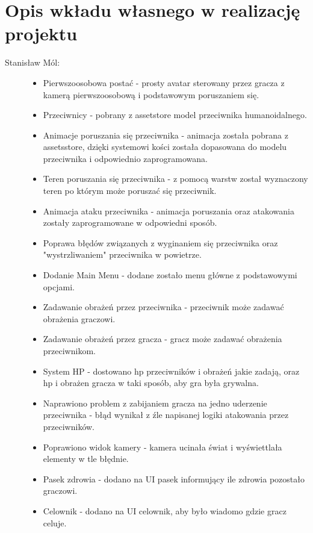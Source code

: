 \documentclass[10pt,a4paper]{article}
\begin{document}
\clearpage
\section{Opis wkładu własnego w realizację projektu}

\vspace{0.5cm}
\begin{description}
  \item[Stanisław Mól:] \hfill
  	\begin{itemize}
 	  \item Pierwszoosobowa postać - prosty avatar sterowany przez gracza z kamerą pierwszoosobową i podstawowym poruszaniem się.
	  \item Przeciwnicy - pobrany z assetstore model przeciwnika humanoidalnego.
	  \item Animacje poruszania się przeciwnika - animacja została pobrana z assetsstore, dzięki systemowi kości została dopasowana do modelu przeciwnika i 				  odpowiednio zaprogramowana.
	  \item Teren poruszania się przeciwnika - z pomocą warstw został wyznaczony teren po którym może poruszać się przeciwnik.
	  \item Animacja ataku przeciwnika - animacja poruszania oraz atakowania zostały zaprogramowane w odpowiedni sposób.
	  \item Poprawa błędów związanych z wyginaniem się przeciwnika oraz "wystrzliwaniem" przeciwnika w powietrze.
	  \item Dodanie Main Menu - dodane zostało menu główne z podstawowymi opcjami.
	  \item Zadawanie obrażeń przez przeciwnika - przeciwnik może zadawać obrażenia graczowi.
	  \item Zadawanie obrażeń przez gracza - gracz może zadawać obrażenia przeciwnikom.
	  \item System HP - dostowano hp przeciwników i obrażeń jakie zadają, oraz hp i obrażen gracza w taki sposób, aby gra była grywalna.
	  \item Naprawiono problem z zabijaniem gracza na jedno uderzenie przeciwnika - błąd wynikał z źle napisanej logiki atakowania przez przeciwników.
	  \item Poprawiono widok kamery - kamera ucinała świat i wyświettlała elementy w tle błędnie.
	  \item Pasek zdrowia - dodano na UI pasek informujący ile zdrowia pozostało graczowi.
	  \item Celownik - dodano na UI celownik, aby było wiadomo gdzie gracz celuje.

\end{itemize}
\end{description}
\end{document}
